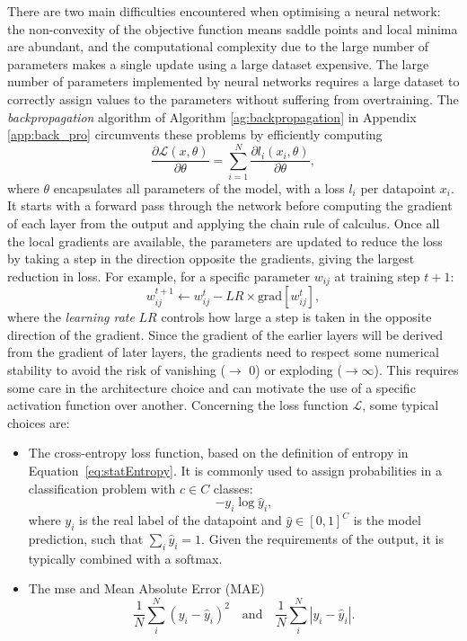 There are two main difficulties encountered when optimising a neural network: the non-convexity of the objective function means saddle points and local minima are abundant, and the computational complexity due to the large number of parameters makes a single update using a large dataset expensive. The large number of parameters implemented by neural networks requires a large dataset to correctly assign values to the parameters without suffering from overtraining. The \textit{backpropagation} algorithm of Algorithm \ref{ag:backpropagation} in Appendix \ref{app:back_pro} circumvents these problems \cite{backprop} by efficiently computing \[ \frac{\partial\mathcal{L}(x, \theta)}{\partial\theta} = \sum_{i=1}^N \frac{\partial l_i(x_i, \theta)}{\partial\theta},\] where $\theta$ encapsulates all parameters of the model, with a loss $l_i$ per datapoint $x_i$. It starts with a forward pass through the network before computing the gradient of each layer from the output and applying the chain rule of calculus. Once all the local gradients are available, the parameters are updated to reduce the loss by taking a step in the direction opposite the gradients, giving the largest reduction in loss. For example, for a specific parameter $w_{ij}$ at training step $t+1$:
\begin{equation}\label{eq:gradientdescent}
    w^{t+1}_{ij} \leftarrow w^{t}_{ij} - LR \times \text{grad}\left[w^{t}_{ij}\right],
\end{equation}
where the \textit{learning rate} $LR$ controls how large a step is taken in the opposite direction of the gradient. Since the gradient of the earlier layers will be derived from the gradient of later layers, the gradients need to respect some numerical stability to avoid the risk of vanishing ($\rightarrow$ 0) or exploding ($\rightarrow \infty$). This requires some care in the architecture choice and can motivate the use of a specific activation function over another. Concerning the loss function $\mathcal{L}$, some typical choices are:
\begin{itemize}
    \item The cross-entropy loss function, based on the definition of entropy in Equation~\ref{eq:statEntropy}. It is commonly used to assign probabilities in a classification problem with $c \in C$ classes: \[ -y_i \log\hat{y}_i,\] where $y_i$ is the real label of the datapoint and $\hat{y} \in [0, 1]^C$ is the model prediction, such that $\sum_i \hat{y}_i = 1$. Given the requirements of the output, it is typically combined with a softmax. 
    \item The \gls{mse} and Mean Absolute Error (MAE) \[\frac{1}{N}\sum_i^N (y_i - \hat{y}_i)^2 \quad \text{and} \quad \frac{1}{N}\sum_i^N |y_i - \hat{y}_i|.\] 
\end{itemize} 

